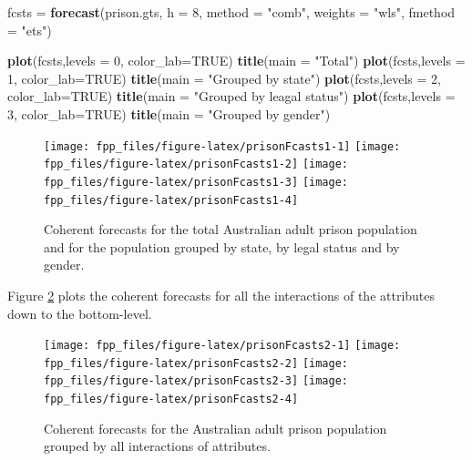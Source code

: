 \documentclass[]{book}
\newenvironment{Shaded}{\begin{snugshade}}{\end{snugshade}}
\newcommand{\DataTypeTok}[1]{\textcolor[rgb]{0.13,0.29,0.53}{#1}}
\newcommand{\DecValTok}[1]{\textcolor[rgb]{0.00,0.00,0.81}{#1}}
\newcommand{\KeywordTok}[1]{\textcolor[rgb]{0.13,0.29,0.53}{\textbf{#1}}}
\newcommand{\NormalTok}[1]{#1}
\newcommand{\OtherTok}[1]{\textcolor[rgb]{0.56,0.35,0.01}{#1}}
\newcommand{\StringTok}[1]{\textcolor[rgb]{0.31,0.60,0.02}{#1}}
\begin{document}
\begin{Shaded}
\begin{Highlighting}[]
\NormalTok{fcsts =}\StringTok{ }\KeywordTok{forecast}\NormalTok{(prison.gts, }\DataTypeTok{h =} \DecValTok{8}\NormalTok{, }\DataTypeTok{method =} \StringTok{"comb"}\NormalTok{, }\DataTypeTok{weights =} \StringTok{"wls"}\NormalTok{, }\DataTypeTok{fmethod =} \StringTok{"ets"}\NormalTok{)}

\KeywordTok{plot}\NormalTok{(fcsts,}\DataTypeTok{levels =} \DecValTok{0}\NormalTok{, }\DataTypeTok{color_lab=}\OtherTok{TRUE}\NormalTok{)}
\KeywordTok{title}\NormalTok{(}\DataTypeTok{main =} \StringTok{"Total"}\NormalTok{)}
\KeywordTok{plot}\NormalTok{(fcsts,}\DataTypeTok{levels =} \DecValTok{1}\NormalTok{, }\DataTypeTok{color_lab=}\OtherTok{TRUE}\NormalTok{)}
\KeywordTok{title}\NormalTok{(}\DataTypeTok{main =} \StringTok{"Grouped by state"}\NormalTok{)}
\KeywordTok{plot}\NormalTok{(fcsts,}\DataTypeTok{levels =} \DecValTok{2}\NormalTok{, }\DataTypeTok{color_lab=}\OtherTok{TRUE}\NormalTok{)}
\KeywordTok{title}\NormalTok{(}\DataTypeTok{main =} \StringTok{"Grouped by leagal status"}\NormalTok{)}
\KeywordTok{plot}\NormalTok{(fcsts,}\DataTypeTok{levels =} \DecValTok{3}\NormalTok{, }\DataTypeTok{color_lab=}\OtherTok{TRUE}\NormalTok{)}
\KeywordTok{title}\NormalTok{(}\DataTypeTok{main =} \StringTok{"Grouped by gender"}\NormalTok{)}
\end{Highlighting}
\end{Shaded}

\begin{figure}

{\centering \texttt{[image: fpp\_files/figure-latex/prisonFcasts1-1]} \texttt{[image: fpp\_files/figure-latex/prisonFcasts1-2]} \texttt{[image: fpp\_files/figure-latex/prisonFcasts1-3]} \texttt{[image: fpp\_files/figure-latex/prisonFcasts1-4]} 

}

\caption{Coherent forecasts for the total Australian adult prison population and for the population grouped by state, by legal status and by gender.}\label{fig:prisonFcasts1}
\end{figure}

Figure \ref{fig:prisonFcasts2} plots the coherent forecasts for all the interactions of the attributes down to the bottom-level.

\begin{figure}

{\centering \texttt{[image: fpp\_files/figure-latex/prisonFcasts2-1]} \texttt{[image: fpp\_files/figure-latex/prisonFcasts2-2]} \texttt{[image: fpp\_files/figure-latex/prisonFcasts2-3]} \texttt{[image: fpp\_files/figure-latex/prisonFcasts2-4]} 

}

\caption{Coherent forecasts for the Australian adult prison population grouped by all interactions of attributes.}\label{fig:prisonFcasts2}
\end{figure}
\end{document}
